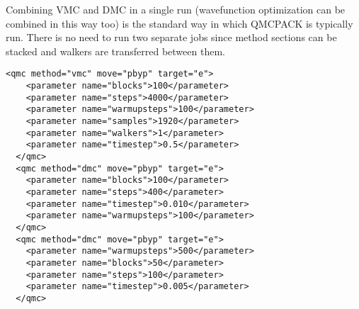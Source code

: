 Combining VMC and DMC in a single run (wavefunction optimization can be combined in this way too) is the standard way in which QMCPACK is typically run.   There is no need to run two separate jobs since method sections can be stacked and walkers are transferred between them.

\begin{lstlisting}[style=QMCPXML,caption=Combined VMC and DMC run. ]
  <qmc method="vmc" move="pbyp" target="e">
    <parameter name="blocks">100</parameter>
    <parameter name="steps">4000</parameter>
    <parameter name="warmupsteps">100</parameter>
    <parameter name="samples">1920</parameter>
    <parameter name="walkers">1</parameter>
    <parameter name="timestep">0.5</parameter>
  </qmc>
  <qmc method="dmc" move="pbyp" target="e">
    <parameter name="blocks">100</parameter>
    <parameter name="steps">400</parameter>
    <parameter name="timestep">0.010</parameter>
    <parameter name="warmupsteps">100</parameter>
  </qmc>
  <qmc method="dmc" move="pbyp" target="e">
    <parameter name="warmupsteps">500</parameter>
    <parameter name="blocks">50</parameter>
    <parameter name="steps">100</parameter>
    <parameter name="timestep">0.005</parameter>
  </qmc>
\end{lstlisting}




